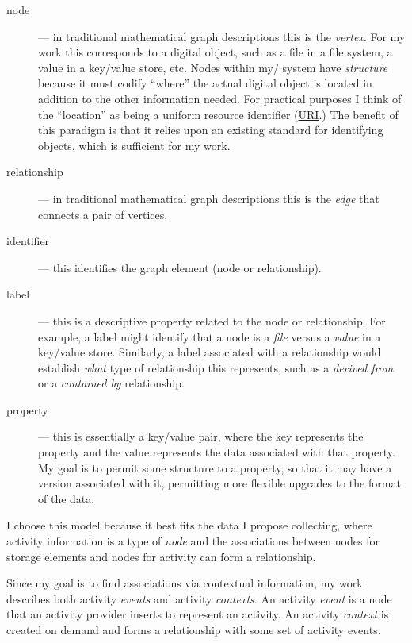 \documentclass[sigconf,anonymous,review]{acmart}
\begin{document}
\begin{description}
    \item[node] --- in traditional mathematical graph descriptions this is the
    \emph{vertex}.  For my work this corresponds to a digital object, such as a
    file in a file system, a value in a key/value store, etc. Nodes within my/
    system have \emph{structure} because it must codify ``where'' the actual
    digital object is located in addition to the other information needed.  For
    practical purposes I think of the ``location'' as being a uniform resource
    identifier (\href{https://datatracker.ietf.org/doc/html/rfc8820}{URI}.)  The
    benefit of this paradigm is that it relies upon an existing standard for
    identifying objects, which is sufficient for my work.

    \item[relationship] --- in traditional mathematical graph descriptions this
    is the \emph{edge} that connects a pair of vertices.

    \item[identifier] --- this identifies the graph element (node or relationship).

    \item[label] --- this is a descriptive property related to the node or
    relationship.  For example, a label might identify that a node is a
    \emph{file} versus a \emph{value} in a key/value store.  Similarly, a label
    associated with a relationship would establish \emph{what} type of
    relationship this represents, such as a \emph{derived from} or a
    \emph{contained by} relationship.

    \item[property] --- this is essentially a key/value pair, where the key
    represents the property and the value represents the data associated with
    that property.  My goal is to permit some structure to a property, so that
    it may have a version associated with it, permitting more flexible upgrades
    to the format of the data.

\end{description}

I choose this model because it best fits the data I propose collecting, where
activity information is a type of \emph{node} and the associations between nodes
for storage elements and nodes for activity can form a relationship.

Since my goal is to find associations via contextual information, my work
describes both activity \emph{events} and activity \emph{contexts}.  An activity
\emph{event} is a node that an activity provider inserts to represent an
activity.  An activity \emph{context} is created on demand and forms a
relationship with some set of activity events.
\end{document}
